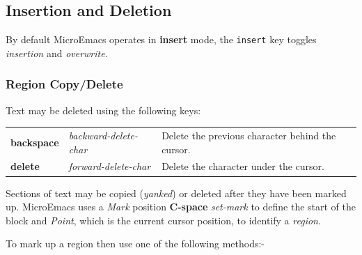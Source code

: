 \documentclass[11pt,a4paper,pdftex]{article}
\begin{document}
\subsection{Insertion and Deletion}

  By default MicroEmacs operates in \textbf{insert} mode, the \texttt{insert}
  key toggles \textit{insertion} and \textit{overwrite}.

\subsubsection{Region Copy/Delete}

  Text may be deleted using the following keys:

  \begin{longtable}{ll@{\ --\ }l}
    \endhead
    \endfoot
    \endlastfoot
    \textbf{backspace} & \textit{backward-delete-char} &
    Delete the previous character behind the cursor.\\
    \textbf{delete} & \textit{forward-delete-char} &
    Delete the character under the cursor.\\
  \end{longtable}

  Sections of text may be copied (\textit{yanked}) or deleted after they have
  been marked up. MicroEmacs uses a \textit{Mark} position \textbf{C-space}
  \textit{set-mark} to define the start of the block and \textit{Point}, which
  is the current cursor position, to identify a \textit{region}.

  To mark up a region then use one of the following methods:-
\end{document}
